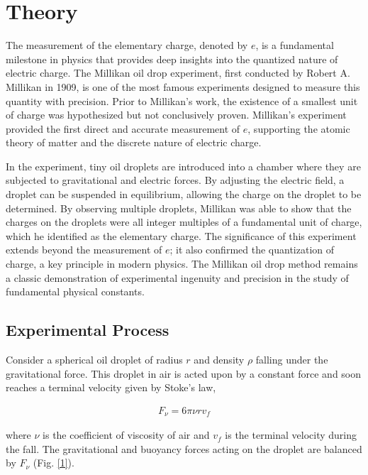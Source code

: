 \section{Theory}
The measurement of the elementary charge, denoted by $e$,
is a fundamental milestone in physics that provides deep
insights into the quantized nature of electric charge. The
Millikan oil drop experiment, first conducted by Robert
A. Millikan in 1909, is one of the most famous experiments designed to measure this quantity with precision.
Prior to Millikan's work, the existence of a smallest unit
of charge was hypothesized but not conclusively proven.
Millikan's experiment provided the first direct and accurate measurement of $e$, supporting the atomic theory of
matter and the discrete nature of electric charge.

In the experiment, tiny oil droplets are introduced into
a chamber where they are subjected to gravitational and
electric forces. By adjusting the electric field, a droplet
can be suspended in equilibrium, allowing the charge
on the droplet to be determined. By observing multiple droplets, Millikan was able to show that the charges
on the droplets were all integer multiples of a fundamental unit of charge, which he identified as the elementary
charge. The significance of this experiment extends beyond the measurement of $e$; it also confirmed the quantization of charge, a key principle in modern physics. The
Millikan oil drop method remains a classic demonstration
of experimental ingenuity and precision in the study of
fundamental physical constants.

\subsection*{Experimental Process}

Consider a spherical oil droplet of radius $r$ and density
$\rho$ falling under the gravitational force. This droplet in
air is acted upon by a constant force and soon reaches
a terminal velocity given by Stoke's law, 

\begin{align}F_\nu = 6\pi \nu rv_f\end{align}

where $\nu$ is the coefficient of viscosity of air and $v_f$ is
the terminal velocity during the fall. The gravitational
and buoyancy forces acting on the droplet are balanced
by $F_\nu$ (Fig. \ref{1}).

